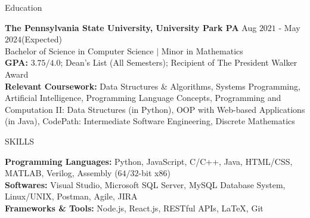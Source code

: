 \documentclass{resume} %
\begin{document}

\begin{rSection}{Education}

{\bf The Pennsylvania State University, University Park PA} \hfill {Aug $2021$ - May $2024$(Expected)}\\
{Bachelor of Science in Computer Science $\vert$ Minor in Mathematics}\\
{\bf GPA:} $3.75/4.0$; Dean's List (All Semesters); Recipient of The President Walker Award\\
{\bf Relevant Coursework:} Data Structures \& Algorithms, Systems Programming, Artificial Intelligence, Programming Language Concepts, Programming and Computation II: Data Structures (in Python), OOP with Web-based Applications (in Java), CodePath: Intermediate Software Engineering, Discrete Mathematics
\end{rSection}


\begin{rSection}{SKILLS}

{\bf Programming Languages:} Python, JavaScript, C/C++, Java, HTML/CSS, MATLAB, Verilog, Assembly ($64/32$-bit x$86$)\\
{\bf Softwares:} Visual Studio, Microsoft SQL Server, MySQL Database System, Linux/UNIX, Postman, Agile, JIRA\\
{\bf Frameworks \& Tools:} Node.js, React.js, RESTful APIs, \LaTeX, Git

\end{rSection}
\end{document}
